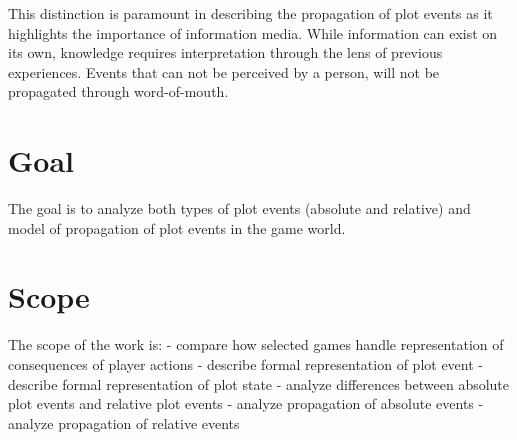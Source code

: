 This distinction is paramount in describing the propagation of plot events as it highlights the importance of information media. While information can exist on its own, knowledge requires interpretation through the lens of previous experiences.
Events that can not be perceived by a person, will not be propagated through word-of-mouth.

\section*{Goal}

The goal is to analyze both types of plot events (absolute and relative) and model of propagation of plot events in the game world.

\section*{Scope}

The scope of the work is:
- compare how selected games handle representation of consequences of player actions
- describe formal representation of plot event
- describe formal representation of plot state
- analyze differences between absolute plot events and relative plot events
- analyze propagation of absolute events
- analyze propagation of relative events